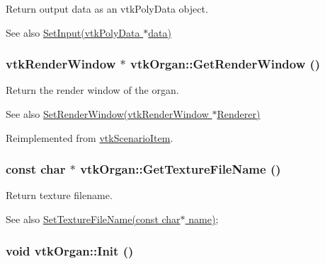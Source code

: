 Return output data as an vtkPolyData object. 

\begin{DoxySeeAlso}{See also}
\hyperlink{classvtkOrgan_a63ce9adb7313bce4dc8aa547ba6736fc}{SetInput(vtkPolyData $\ast$data)} 
\end{DoxySeeAlso}
\hypertarget{classvtkOrgan_ae670e2727313073a9659a2795ce64c98}{
\subsubsection[{GetRenderWindow}]{\setlength{\rightskip}{0pt plus 5cm}vtkRenderWindow $\ast$ vtkOrgan::GetRenderWindow ()}}
\label{classvtkOrgan_ae670e2727313073a9659a2795ce64c98}


Return the render window of the organ. 

\begin{DoxySeeAlso}{See also}
\hyperlink{classvtkOrgan_a2b6a862da0f1ca6cd192138cdd00b04b}{SetRenderWindow(vtkRenderWindow $\ast$Renderer)} 
\end{DoxySeeAlso}


Reimplemented from \hyperlink{classvtkScenarioItem_a9d7908b11d2a477827342c05bb505e66}{vtkScenarioItem}.

\hypertarget{classvtkOrgan_aaec0735181654c6500d0767eed30b94d}{
\subsubsection[{GetTextureFileName}]{\setlength{\rightskip}{0pt plus 5cm}const char $\ast$ vtkOrgan::GetTextureFileName ()}}
\label{classvtkOrgan_aaec0735181654c6500d0767eed30b94d}


Return texture filename. 

\begin{DoxySeeAlso}{See also}
\hyperlink{classvtkOrgan_af19a32e071ae5f9c9848b2ad7088d0c1}{SetTextureFileName(const char$\ast$ name)}; 
\end{DoxySeeAlso}
\hypertarget{classvtkOrgan_a48aa20d7255903b3f7ac5cd2a4adec8c}{
\subsubsection[{Init}]{\setlength{\rightskip}{0pt plus 5cm}void vtkOrgan::Init ()}}
\label{classvtkOrgan_a48aa20d7255903b3f7ac5cd2a4adec8c}



